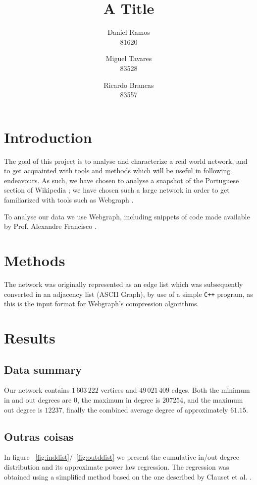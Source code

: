 \documentclass[9pt,a4paper,twocolumn]{article}
\title{A Title}
\author{Daniel Ramos \\ 81620 \and Miguel Tavares \\ 83528 \and Ricardo Brancas  \\ 83557}
\begin{document}
\maketitle

\section{Introduction}
The goal of this project is to analyse and characterize a real world network, and to  get 
acquainted with tools and methods which will be useful in following endeavours.
As such, we have chosen to analyse a snapshot of the Portuguese section of Wikipedia \cite{dataset};
we have chosen such a large network in order to get familiarized with tools such as Webgraph \cite{webgraph}.

To analyse our data we use Webgraph, including snippets of code made available
by Prof. Alexandre Francisco \cite{aplf}.


\section{Methods}
The network was originally represented as an edge list which was subsequently converted in an adjacency list (ASCII Graph), by use of a simple \texttt{C++} program, as this is the input
format for Webgraph's compression algorithms. 





\section{Results}
\subsection{Data summary}
Our network contains $1\,603\,222$ vertices and $49\,021\,409$ edges. Both the minimum in and out degrees are $0$, the maximum in degree is $207254$, and the maximum out degree is $12237$, finally the combined average degree of approximately $61.15$.

\subsection{Outras coisas}

In figure ~\ref{fig:inddist}/~\ref{fig:outddist} we present the cumulative in/out degree distribution and its approximate power law regression. The regression was obtained using a simplified method based on the one described by Clauset et al. \cite{Clauset2009}.
\end{document}
